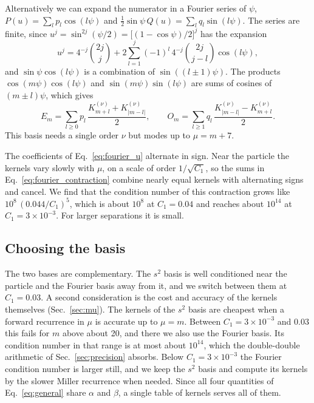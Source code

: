 \documentclass[11pt]{article}
\newcommand{\Kmn}[2]{K_{#1}^{(#2)}}
\begin{document}
Alternatively we can expand the numerator in a Fourier series of $\psi$,
$P(u)=\sum_l p_l\cos(l\psi)$ and $\tfrac12\sin\psi\,Q(u)=\sum_l q_l\sin(l\psi)$.
The series are finite, since $u^j=\sin^{2j}(\psi/2)=\bigl[(1-\cos\psi)/2\bigr]^j$
has the expansion
\begin{equation}
  \label{eq:fourier_u}
  u^j = 4^{-j}\binom{2j}{j} + 2\sum_{l=1}^{j}(-1)^l\,4^{-j}\binom{2j}{j-l}\cos(l\psi),
\end{equation}
and $\sin\psi\cos(l\psi)$ is a combination of $\sin((l\pm1)\psi)$. The
products $\cos(m\psi)\cos(l\psi)$ and $\sin(m\psi)\sin(l\psi)$ are sums of
cosines of $(m\pm l)\psi$, which gives
\begin{equation}
  \label{eq:fourier_contraction}
  E_m = \sum_{l\ge0} p_l\,\frac{\Kmn{m+l}{\nu}+\Kmn{|m-l|}{\nu}}{2}, \qquad
  O_m = \sum_{l\ge1} q_l\,\frac{\Kmn{|m-l|}{\nu}-\Kmn{m+l}{\nu}}{2}.
\end{equation}
This basis needs a single order $\nu$ but modes up to $\mu=m+7$.

The coefficients of Eq.~\eqref{eq:fourier_u} alternate in sign. Near the
particle the kernels vary slowly with $\mu$, on a scale of order
$1/\sqrt{C_1}$, so the sums in Eq.~\eqref{eq:fourier_contraction} combine
nearly equal kernels with alternating signs and cancel. We find that the
condition number of this contraction grows like $10^8\,(0.044/C_1)^5$, which is
about $10^8$ at $C_1=0.04$ and reaches about $10^{14}$ at
$C_1=3\times10^{-3}$. For larger separations it is small.

\subsection{Choosing the basis}
\label{sec:choice}

The two bases are complementary. The $s^2$ basis is well conditioned near the
particle and the Fourier basis away from it, and we switch between them at
$C_1=0.03$. A second consideration is the cost and accuracy of the kernels
themselves (Sec.~\ref{sec:mu}). The kernels of the $s^2$ basis are cheapest
when a forward recurrence in $\mu$ is accurate up to $\mu=m$. Between
$C_1=3\times10^{-3}$ and $0.03$ this fails for $m$ above about 20, and there we
also use the Fourier basis. Its condition number in that range is at most about
$10^{14}$, which the double-double arithmetic of Sec.~\ref{sec:precision}
absorbs. Below $C_1=3\times10^{-3}$ the Fourier condition number is larger
still, and we keep the $s^2$ basis and compute its kernels by the slower
Miller recurrence when needed. Since all four quantities of
Eq.~\eqref{eq:general} share $\alpha$ and $\beta$, a single table of kernels
serves all of them.
\end{document}
